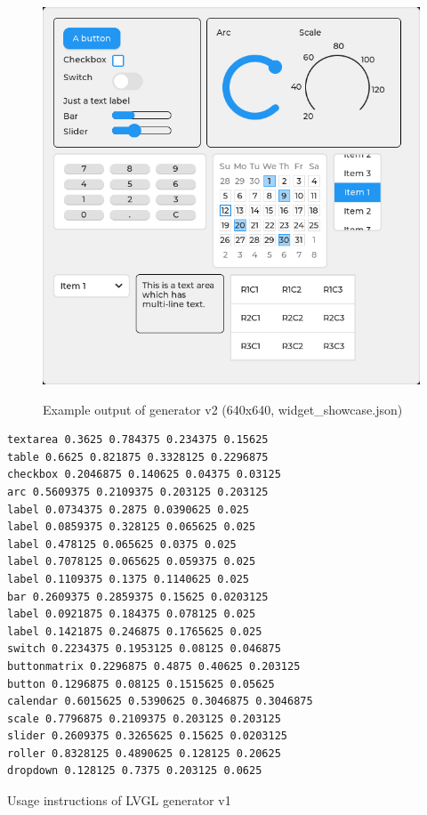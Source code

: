 \documentclass[Bachelor, BIC, english, fhCitStyle, IEEE]{BASE/twbook} %
\begin{document}
\begin{figure}
    \caption{Example output of generator v2 (640x640, widget\_showcase.json)}
    \centering
    \includegraphics[width=\textwidth]{generator_v2_example.jpg}
    \label{fig:genv2example}
\end{figure}
\begin{listing}[htbp]
    \begin{verbatim}
textarea 0.3625 0.784375 0.234375 0.15625
table 0.6625 0.821875 0.3328125 0.2296875
checkbox 0.2046875 0.140625 0.04375 0.03125
arc 0.5609375 0.2109375 0.203125 0.203125
label 0.0734375 0.2875 0.0390625 0.025
label 0.0859375 0.328125 0.065625 0.025
label 0.478125 0.065625 0.0375 0.025
label 0.7078125 0.065625 0.059375 0.025
label 0.1109375 0.1375 0.1140625 0.025
bar 0.2609375 0.2859375 0.15625 0.0203125
label 0.0921875 0.184375 0.078125 0.025
label 0.1421875 0.246875 0.1765625 0.025
switch 0.2234375 0.1953125 0.08125 0.046875
buttonmatrix 0.2296875 0.4875 0.40625 0.203125
button 0.1296875 0.08125 0.1515625 0.05625
calendar 0.6015625 0.5390625 0.3046875 0.3046875
scale 0.7796875 0.2109375 0.203125 0.203125
slider 0.2609375 0.3265625 0.15625 0.0203125
roller 0.8328125 0.4890625 0.128125 0.20625
dropdown 0.128125 0.7375 0.203125 0.0625
    \end{verbatim}
    \caption{Usage instructions of LVGL generator v1}
\end{listing}
\end{document}
